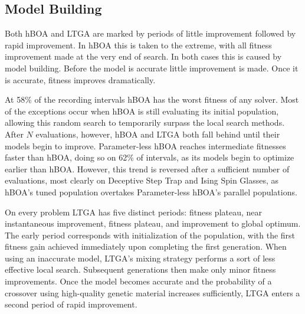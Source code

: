 \subsection{Model Building}
Both hBOA and LTGA are marked by periods of little improvement followed by rapid improvement.
In hBOA this is taken to the extreme, with all fitness
improvement made at the very end of search. In both cases this is caused by model building. Before the model
is accurate little improvement is made. Once it is accurate, fitness improves dramatically.

At 58\% of the recording intervals hBOA has the worst fitness of any solver. Most of the exceptions
occur when hBOA is still evaluating its initial population, allowing this random search to temporarily surpass the
local search methods. After $N$ evaluations, however, hBOA and LTGA both fall behind until their models begin
to improve.
Parameter-less hBOA reaches intermediate fitnesses faster than hBOA, doing so on 62\% of intervals, as its models begin
to optimize earlier than hBOA.  However, this trend is reversed after a sufficient number of evaluations, most clearly
on Deceptive Step Trap and Ising Spin Glasses, as hBOA's tuned population overtakes Parameter-less hBOA's parallel populations.

On every problem LTGA has five distinct periods: fitness plateau, near instantaneous improvement, fitness plateau,
and improvement to global optimum. The early period corresponds with
initialization of the population, with the first fitness gain achieved immediately upon completing the first generation.
When using an inaccurate model, LTGA's mixing strategy performs a sort of less effective local search.
Subsequent generations then make only minor fitness improvements. Once the model
becomes accurate and the probability of a crossover using high-quality genetic material increases sufficiently, LTGA
enters a second period of rapid improvement.

\begin{comment}
This behavior is easiest to understand on the two Trap problems. LTGA's first generation will push individual traps toward a
local optima, but it requires more than a single generation to do so completely. Until that occurs, the model is likely behaving
no better than random as there is little apparent linkage between bits. Once the model begins to identify individual traps, crossover
can begin to increase the frequency of higher fitness trap settings. This process begins slowly as low fitness local optima are more
likely to be chosen for donation than high fitness local optima due to their frequency in the population. The process becomes
self-catalysing as increased frequency of the global optimum trap genes means increased likelihood of the global optimum being spread by crossover.
\end{comment}

